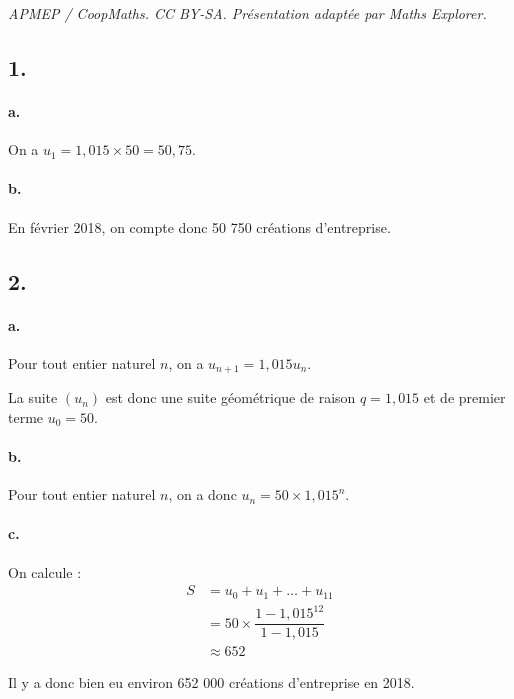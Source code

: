 \documentclass[10pt]{article}
\begin{document}
\noindent\textit{APMEP / CoopMaths. CC BY-SA. Présentation adaptée par Maths Explorer.}\par\medskip
\subsection*{1.}

\paragraph{a.} On a \( u_1 = 1{,}015 \times 50 = 50{,}75 \).

\paragraph{b.} En février 2018, on compte donc 50 750 créations d'entreprise.

\subsection*{2.}

\paragraph{a.} Pour tout entier naturel \( n \), on a \( u_{n+1} = 1{,}015 u_n \).

La suite \( (u_n) \) est donc une suite géométrique de raison \( q = 1{,}015 \) et de premier terme \( u_0 = 50 \).

\paragraph{b.} Pour tout entier naturel \( n \), on a donc \( u_n = 50 \times 1{,}015^n \).

\paragraph{c.} On calcule :
\begin{align*}
S &= u_0 + u_1 + \dots + u_{11} \\
&= 50 \times \dfrac{1 - 1{,}015^{12}}{1 - 1{,}015} \\
&\approx 652
\end{align*}

Il y a donc bien eu environ 652 000 créations d'entreprise en 2018.
\end{document}
